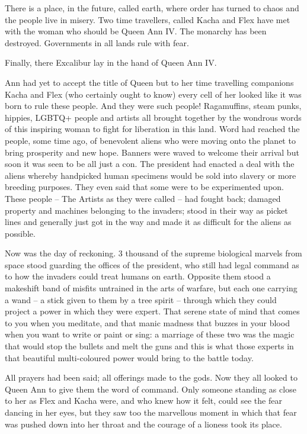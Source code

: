 
\prelude

There is a place, in the future, called earth, where order has turned
to chaos and the people live in misery. Two time travellers, called
Kacha and Flex have met with the woman who should be Queen Ann IV. The
monarchy has been destroyed. Governments in all lands rule with fear.

Finally, there Excalibur lay in the hand of Queen Ann IV. 

\fugue

Ann had yet to accept the title of Queen
but to her time travelling companions
Kacha and Flex (who certainly ought to know)
every cell of her looked like it was born to rule these people. And
they were such people! Ragamuffins, steam punks, hippies, LGBTQ+ people and
artists all brought together by the wondrous words of this inspiring
woman to fight for liberation in this land. Word had reached the
people, some time ago, of benevolent aliens who were moving onto the
planet to bring prosperity and new hope. Banners were waved to welcome
their arrival but soon it was seen to be all just a con. The president
had enacted a deal with the aliens whereby handpicked human specimens
would be sold into slavery or more breeding purposes. They even said
that some were to be experimented upon. These people – The Artists as
they were called – had fought back; damaged property and machines
belonging to the invaders; stood in their way as picket lines and
generally just got in the way and made it as difficult for the aliens
as possible.

Now was the day of reckoning. 3 thousand of the supreme biological
marvels from space stood guarding the offices of the president, who
still had legal command as to how the invaders could treat humans on
earth. Opposite them stood a makeshift band of misfits untrained in
the arts of warfare, but each one carrying a wand – a stick given to
them by a tree spirit – through which they could project a power in
which they were expert. That serene state of mind that comes to you
when you meditate, and that manic madness that buzzes in your blood
when you want to write or paint or sing: a marriage of these two was
the magic that would stop the bullets and melt the guns and this is
what those experts in that beautiful multi-coloured power would bring
to the battle today.

All prayers had been said; all offerings made to the gods. Now they
all looked to Queen Ann to give them the word of command. Only someone
standing as close to her as Flex and Kacha were, and who knew how it
felt, could see the fear dancing in her eyes, but they saw too the
marvellous moment in which that fear was pushed down into her throat
and the courage of a lioness took its place.

